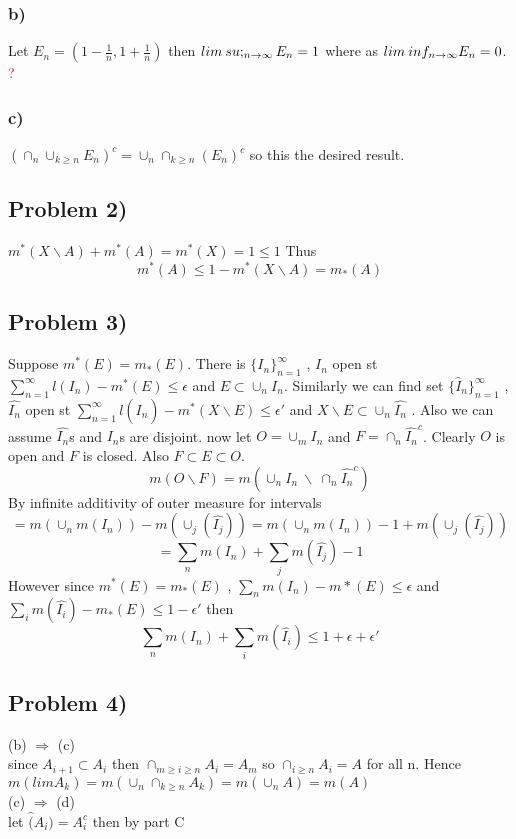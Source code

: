 \documentclass[paper=letter, fontsize=11pt]{scrartcl} %
\newcommand{\set}[1]{\{#1\}}
\begin{document}
    \subsubsection*{b)}
    Let $E_n= (1-\frac{1}{n},1+\frac{1}{n})$ then $lim\:su;_{n \rightarrow \infty} E_n={1}$ where as $lim\:inf_{n \rightarrow \infty} E_n=0$. \textcolor{red}{?}
    \subsubsection*{c)}
    $(\cap_{n} \cup_{k \geq n} E_n)^c= \cup_n \cap_{k \geq n} (E_n) ^c$ so this the desired result.
    \subsection*{Problem 2)}
    \newcommand{\lbms}[1]{m^*(#1)}
    $\lbms{X\backslash A}+\lbms{A}=\lbms{X}=1 \leq 1$ Thus 
    $$\lbms{A} \leq 1 - \lbms{X\backslash A} = m_* (A)$$
    \subsection*{Problem 3)}
    Suppose $m^*(E)=m_*(E)$.  There is $\set{I_n}_{n=1} ^ {\infty}$ , $I_n$ open st $ \sum_{n=1} ^{\infty} l(I_n) - m^*(E) \leq \epsilon $ and $E \subset \cup_n I_n $. Similarly we can find set $\set{\hat{I}_n}_{n=1} ^ {\infty}$ , $\hat{I_n}$ open st $ \sum_{n=1} ^{\infty} l(\hat{I_n}) - m^*(X\backslash E) \leq \epsilon'$ and $X \backslash E \subset \cup_n \hat{I_n}$
    . Also we can assume  $\hat{I_n}$s and $I_n$s are disjoint. now let $O = \cup _m  I_n$ and $F= \cap _n \hat{I_n}^c$. Clearly $O$ is open and $F$ is closed. Also $F \subset E \subset O$.
$$m(O\backslash F)= m(\cup_n I_n \: \backslash \: \cap_n \hat{I_n}^c)$$
By infinite additivity of outer measure for intervals
$$=m(\cup_n m(I_n))-m(\cup _j (\hat{I_j}))=m(\cup_n m(I_n))-1+m(\cup _j (\hat{I_j}))$$
$$=\sum_n m(I_n) + \sum _j m(\hat{I_j})-1$$
However since $m^*(E)=m_*(E)$ , $\sum_n m(I_n) - m*(E) \leq \epsilon$ and  $\sum_i m(\hat{I_i}) - m_*(E) \leq 1- \epsilon'$
then $$\sum_n m(I_n) + \sum_i m(\hat{I_i}) \leq 1+ \epsilon + \epsilon '$$ 
\subsection*{Problem 4)}
(b) $\Rightarrow$ (c) \\
since $A_{i+1}\subset A_i$ then $\cap_{m\geq i \geq n} A_i = A_m$ so $\cap_{ i \geq n} A_i = A$ for all n. Hence 
$m(limA_k)=m(\cup _n \cap_{k\geq n} A_k)=m(\cup_n A)=m(A)$ \\
(c) $\Rightarrow$ (d)\\
let $\hat(A_i)=A_i^c$ then by part C 
\end{document}
